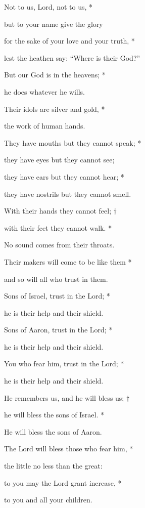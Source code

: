 Not to us, Lord, not to us, *

but to your name give the glory

for the sake of your love and your truth, *

lest the heathen say: “Where is their God?”



But our God is in the heavens; *

he does whatever he wills.

Their idols are silver and gold, *

the work of human hands.



They have mouths but they cannot speak; *

they have eyes but they cannot see;

they have ears but they cannot hear; *

they have nostrils but they cannot smell.



With their hands they cannot feel; †

with their feet they cannot walk. *

No sound comes from their throats.



Their makers will come to be like them *

and so will all who trust in them.



Sons of Israel, trust in the Lord; *

he is their help and their shield.

Sons of Aaron, trust in the Lord; *

he is their help and their shield.



You who fear him, trust in the Lord; *

he is their help and their shield.

He remembers us, and he will bless us; †

he will bless the sons of Israel. *

He will bless the sons of Aaron.



The Lord will bless those who fear him, *

the little no less than the great:

to you may the Lord grant increase, *

to you and all your children.



